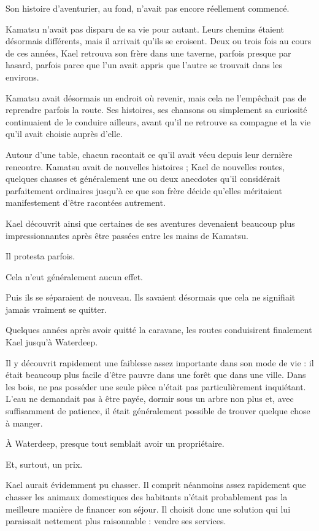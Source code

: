 Son histoire d'aventurier, au fond, n'avait pas encore réellement commencé.

\scenebreak

Kamatsu n'avait pas disparu de sa vie pour autant. Leurs chemins étaient
désormais différents, mais il arrivait qu'ils se croisent. Deux ou trois fois
au cours de ces années, Kael retrouva son frère dans une taverne, parfois
presque par hasard, parfois parce que l'un avait appris que l'autre se trouvait
dans les environs.

Kamatsu avait désormais un endroit où revenir, mais cela ne l'empêchait pas de
reprendre parfois la route. Ses histoires, ses chansons ou simplement sa
curiosité continuaient de le conduire ailleurs, avant qu'il ne retrouve sa
compagne et la vie qu'il avait choisie auprès d'elle.

Autour d'une table, chacun racontait ce qu'il avait vécu depuis leur dernière
rencontre. Kamatsu avait de nouvelles histoires ; Kael de nouvelles routes,
quelques chasses et généralement une ou deux anecdotes qu'il considérait
parfaitement ordinaires jusqu'à ce que son frère décide qu'elles méritaient
manifestement d'être racontées autrement.

Kael découvrit ainsi que certaines de ses aventures devenaient beaucoup plus
impressionnantes après être passées entre les mains de Kamatsu.

Il protesta parfois.

Cela n'eut généralement aucun effet.

Puis ils se séparaient de nouveau. Ils savaient désormais que cela ne
signifiait jamais vraiment se quitter.

\scenebreak

Quelques années après avoir quitté la caravane, les routes conduisirent
finalement Kael jusqu'à Waterdeep.

Il y découvrit rapidement une faiblesse assez importante dans son mode de vie :
il était beaucoup plus facile d'être pauvre dans une forêt que dans une ville.
Dans les bois, ne pas posséder une seule pièce n'était pas particulièrement
inquiétant. L'eau ne demandait pas à être payée, dormir sous un arbre non plus
et, avec suffisamment de patience, il était généralement possible de trouver
quelque chose à manger.

À Waterdeep, presque tout semblait avoir un propriétaire.

Et, surtout, un prix.

Kael aurait évidemment pu chasser. Il comprit néanmoins assez rapidement que
chasser les animaux domestiques des habitants n'était probablement pas la
meilleure manière de financer son séjour. Il choisit donc une solution qui lui
paraissait nettement plus raisonnable : vendre ses services.

